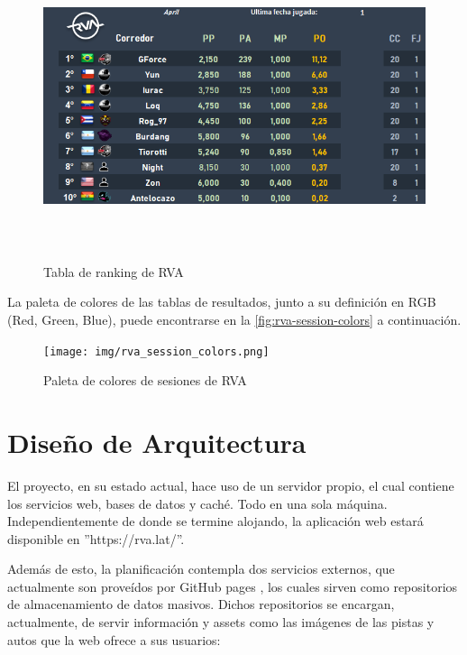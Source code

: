 \begin{figure}[H]
  \begin{center}
    \includegraphics[width=16cm, height=9cm]{img/ranking_table.png} 
  \end{center}
  \caption[Tabla de ranking de RVA]{Tabla de ranking de RVA}
  \label{fig:ranking-table}
\end{figure}

La paleta de colores de las tablas de resultados, junto a su definición en RGB (Red, Green, Blue), puede encontrarse en la \autoref{fig:rva-session-colors} a continuación.

\begin{figure}[H]
  \begin{center}
    \texttt{[image: img/rva\_session\_colors.png]} 
  \end{center}
  \caption[Paleta de colores de sesiones de RVA]{Paleta de colores de sesiones de RVA}
  \label{fig:rva-session-colors}
\end{figure}

\newpage

\section{Diseño de Arquitectura}
El proyecto, en su estado actual, hace uso de un servidor propio, el cual contiene los servicios web, bases de datos y caché. Todo en una sola máquina. Independientemente de donde se termine alojando, la aplicación web estará disponible en ''https://rva.lat/''.

Además de esto, la planificación contempla dos servicios externos, que actualmente son proveídos por GitHub pages \cite{ghpages}, los cuales sirven como repositorios de almacenamiento de datos masivos. Dichos repositorios se encargan, actualmente, de servir información y assets como las imágenes de las pistas y autos que la web ofrece a sus usuarios:

